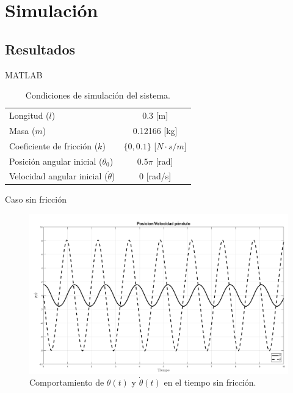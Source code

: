 \documentclass{beamer}
\begin{document}
\section{Simulación}
\subsection{Resultados}
\begin{frame}{MATLAB}
 \begin{table}[hb]
 \begin{center}
\begin{tabular}{lc}
\hline
Longitud ($l$) & 0.3 [m] \\
Masa ($m$) & 0.12166 [kg]\\
Coeficiente de fricción ($k$) & $\{0,0.1\}$ [$N \cdot s / m$] \\
Posición angular inicial ($\theta_0$) & $0.5\pi$ [rad] \\
Velocidad angular inicial ($\dot{\theta}$) & 0 [rad/s] \\
\hline
 \end{tabular}
 \end{center}
 \caption{Condiciones de simulación del sistema.}
\label{table: simulation conditions}
\end{table}

\end{frame}


\begin{frame}{Caso sin fricción}
\begin{figure}[hb!]
 \centering 
 \includegraphics[scale=0.2]{../Report/img/PosVelNF.png}
 \caption{Comportamiento de $\theta(t)$ y $\dot{\theta}(t)$ en el tiempo sin fricción.}
 \label{fig: time plot theta dtheta no friction}
\end{figure}

\end{frame}
\end{document}
